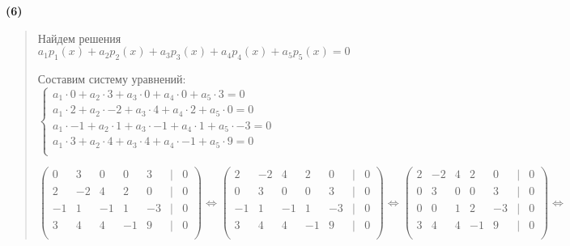 \documentclass{article}
\begin{document}
\textbf{\textsf{(6)}}
\begin{quote}
    Найдем решения
    $a_1 p_1(x) + a_2 p_2(x) + a_3 p_3(x) + a_4 p_4(x) + a_5 p_5(x) = 0$
    
   Составим систему уравнений: 
   $
   \begin{cases}
       a_1 \cdot 0 + a_2 \cdot 3 + a_3 \cdot 0 + a_4 \cdot 0 + a_5 \cdot 3 = 0 \\
       a_1 \cdot 2 + a_2 \cdot -2 + a_3 \cdot 4 + a_4 \cdot 2 + a_5 \cdot 0 = 0 \\
       a_1 \cdot -1 + a_2 \cdot 1 + a_3 \cdot -1 + a_4 \cdot 1 + a_5 \cdot -3 = 0 \\
       a_1 \cdot 3 + a_2 \cdot 4 + a_3 \cdot 4 + a_4 \cdot -1 + a_5 \cdot 9 = 0 \\
   \end{cases}
   $

   $
   \begin{pmatrix}
       0 & 3 & 0 & 0 & 3 & | & 0 \\
       2 & -2 & 4 & 2 & 0 & | & 0 \\
       -1 & 1 & -1 & 1 & -3 & | & 0 \\
       3 & 4 & 4 & -1 & 9 & | & 0 \\
   \end{pmatrix}
   \Leftrightarrow
   \begin{pmatrix}
       2 & -2 & 4 & 2 & 0 & | & 0 \\
       0 & 3 & 0 & 0 & 3 & | & 0 \\
       -1 & 1 & -1 & 1 & -3 & | & 0 \\
       3 & 4 & 4 & -1 & 9 & | & 0 \\
   \end{pmatrix}
      \Leftrightarrow
   \begin{pmatrix}
       2 & -2 & 4 & 2 & 0 & | & 0 \\
       0 & 3 & 0 & 0 & 3 & | & 0 \\
       0 & 0 & 1 & 2 & -3 & | & 0 \\
       3 & 4 & 4 & -1 & 9 & | & 0 \\
   \end{pmatrix}
   \Leftrightarrow
   $


\end{quote}
\end{document}

